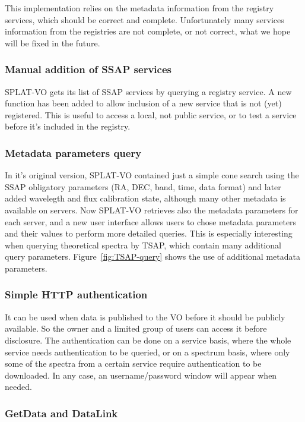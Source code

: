 \documentclass[final,authoryear,5p,times,twocolumn]{elsarticle}
\begin{document}
This implementation relies on the metadata information from the
registry services, which should be correct and complete. Unfortunately
many services information from the registries are not complete, or not
correct, what we hope will be fixed in the future.



\subsubsection{Manual addition of SSAP services}

SPLAT-VO gets its list of SSAP services by querying a registry
service.  A new function has been added to allow inclusion of a new
service that is not (yet) registered. This is useful to access a
local, not public service, or to test a service before it's included
in the registry.

\subsubsection{Metadata parameters query}

In it's original version, SPLAT-VO contained just a simple cone search using
the SSAP obligatory parameters (RA, DEC, band, time, data format) and later
added wavelegth and flux calibration state, although many other metadata is
available on servers.  Now SPLAT-VO retrieves also the metadata parameters for
each server, and a new user interface allows users to chose metadata
parameters and their values to perform more detailed queries.  This is
especially interesting when querying theoretical spectra by TSAP, which contain many
additional query parameters. Figure~\ref{fig:TSAP-query} shows the
use of additional metadata parameters.

\subsubsection{Simple HTTP authentication}

It can be used when data is published to the VO before it should be
publicly available. So the owner and a limited group of users can
access it before disclosure. The authentication can be done on a
service basis, where the whole service needs authentication to be
queried, or on a spectrum basis, where only some of the spectra from a
certain service require authentication to be downloaded. In any case,
an username/password window will appear when needed.

\subsubsection{GetData and DataLink}
\end{document}
